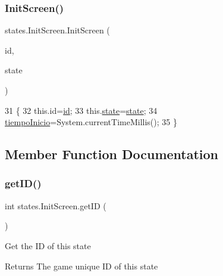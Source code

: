 \subsubsection{\texorpdfstring{Init\+Screen()}{InitScreen()}}
{\footnotesize\ttfamily states.\+Init\+Screen.\+Init\+Screen (\begin{DoxyParamCaption}\item[{int}]{id,  }\item[{\mbox{\hyperlink{classorg_1_1newdawn_1_1slick_1_1state_1_1_state_based_game}{State\+Based\+Game}}}]{state }\end{DoxyParamCaption})\hspace{0.3cm}{\ttfamily [inline]}}


\begin{DoxyCode}
31                                                    \{
32         this.\textcolor{keywordtype}{id}=\mbox{\hyperlink{classstates_1_1_init_screen_a87ad48b02237b484fef3e4f22393eec9}{id}};
33         this.\mbox{\hyperlink{classstates_1_1_init_screen_a18c729614a5791801410d22943a7c36f}{state}}=\mbox{\hyperlink{classstates_1_1_init_screen_a18c729614a5791801410d22943a7c36f}{state}};
34         \mbox{\hyperlink{classstates_1_1_init_screen_aefd25c80ad27b262ec41fa796aa5885a}{tiempoInicio}}=System.currentTimeMillis();
35     \}
\end{DoxyCode}


\subsection{Member Function Documentation}
\mbox{\label{classstates_1_1_init_screen_a7ca8734976ee39db7bd5c72d63e7a9b9}} 
\subsubsection{\texorpdfstring{get\+I\+D()}{getID()}}
{\footnotesize\ttfamily int states.\+Init\+Screen.\+get\+ID (\begin{DoxyParamCaption}{ }\end{DoxyParamCaption})\hspace{0.3cm}{\ttfamily [inline]}}

Get the ID of this state

\begin{DoxyReturn}{Returns}
The game unique ID of this state 
\end{DoxyReturn}


